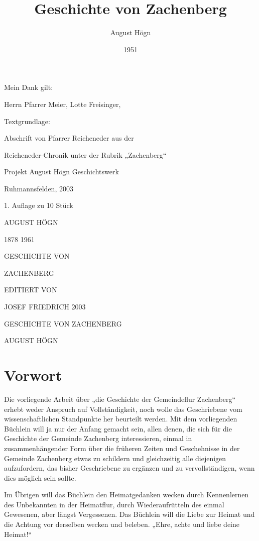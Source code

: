 \documentclass{book}
\begin{document}
\title{Geschichte von Zachenberg}
\author{August Högn}
\date{1951}

\maketitle

Mein Dank gilt:

Herrn Pfarrer Meier, Lotte Freisinger,

Textgrundlage:

Abschrift von Pfarrer Reicheneder aus der

Reicheneder-Chronik unter der Rubrik „Zachenberg“

\tableofcontents
\newpage



Projekt August Högn Geschichtswerk

Ruhmannsfelden, 2003

1. Auflage zu 10 Stück

AUGUST HÖGN

1878 1961





GESCHICHTE VON

ZACHENBERG




EDITIERT VON

JOSEF FRIEDRICH 2003







GESCHICHTE VON ZACHENBERG

AUGUST HÖGN

\part{Vorwort}

Die vorliegende Arbeit über „die Geschichte der Gemeindeflur Zachenberg“ erhebt
weder Anspruch auf Vollständigkeit, noch wolle das Geschriebene vom
wissenschaftlichen Standpunkte her beurteilt werden. Mit dem vorliegenden
Büchlein will ja nur der Anfang gemacht sein, allen denen, die sich für die
Geschichte der Gemeinde Zachenberg interessieren, einmal in zusammenhängender
Form über die früheren Zeiten und Geschehnisse in der Gemeinde Zachenberg etwas
zu schildern und gleichzeitig alle diejenigen aufzufordern, das bisher
Geschriebene zu ergänzen und zu vervollständigen, wenn dies möglich sein sollte.

Im Übrigen will das Büchlein den Heimatgedanken wecken durch Kennenlernen des
Unbekannten in der Heimatflur, durch Wiederaufrütteln des einmal Gewesenen, aber
längst Vergessenen. Das Büchlein will die Liebe zur Heimat und die Achtung vor
derselben wecken und beleben. „Ehre, achte und liebe deine Heimat!“
\end{document}

